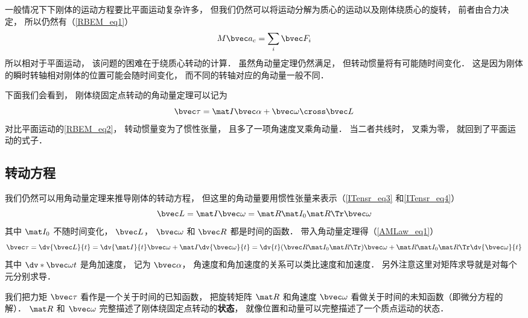 

一般情况下下刚体的运动方程要比平面运动复杂许多， 但我们仍然可以将运动分解为质心的运动以及刚体绕质心的旋转， 前者由合力决定， 所以仍然有（\autoref{RBEM_eq1}）
\begin{equation}\label{RBEqM_eq8}
M\bvec a_c = \sum_i \bvec F_i
\end{equation}
所以相对于平面运动， 该问题的困难在于绕质心转动的计算． 虽然角动量定理仍然满足， 但转动惯量将有可能随时间变化． 这是因为刚体的瞬时转轴相对刚体的位置可能会随时间变化， 而不同的转轴对应的角动量一般不同．

下面我们会看到， 刚体绕固定点转动的角动量定理可以记为
\begin{equation}
\bvec\tau = \mat I \bvec\alpha + \bvec\omega \cross \bvec L
\end{equation}
对比平面运动的\autoref{RBEM_eq2}， 转动惯量变为了惯性张量， 且多了一项角速度叉乘角动量． 当二者共线时， 叉乘为零， 就回到了平面运动的式子．

\subsection{转动方程}
我们仍然可以用角动量定理来推导刚体的转动方程， 但这里的角动量要用惯性张量来表示（\autoref{ITensr_eq3} 和\autoref{ITensr_eq4}）
\begin{equation}
\bvec L = \mat I \bvec \omega = \mat R \mat I_0 \mat R\Tr \bvec \omega
\end{equation}
其中 $\mat I_0$ 不随时间变化， $\bvec L$， $\bvec \omega$ 和 $\bvec R$ 都是时间的函数． 带入角动量定理得（\autoref{AMLaw_eq1}）
\begin{equation}\label{RBEqM_eq3}
\bvec \tau = \dv{\bvec L}{t} = \dv{\mat I}{t} \bvec\omega + \mat I \dv{\bvec\omega}{t}
= \dv{t} (\bvec R\mat I_0 \mat R\Tr) \bvec \omega + \mat R \mat I_0 \mat R\Tr \dv{\bvec \omega}{t}
\end{equation}
其中 $\dv*{\bvec\omega}{t}$ 是角加速度， 记为 $\bvec\alpha$， 角速度和角加速度的关系可以类比速度和加速度． 另外注意这里对矩阵求导就是对每个元分别求导．

我们把力矩 $\bvec \tau$ 看作是一个关于时间的已知函数， 把旋转矩阵 $\mat R$ 和角速度 $\bvec \omega$ 看做关于时间的未知函数（即微分方程的解）． $\mat R$ 和 $\bvec \omega$ 完整描述了刚体绕固定点转动的\textbf{状态}， 就像位置和动量可以完整描述了一个质点运动的状态．

